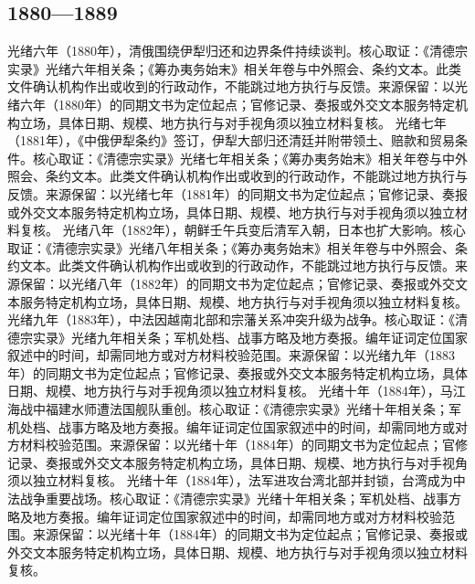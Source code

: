 \subsection{1880—1889}
光绪六年（1880年），清俄围绕伊犁归还和边界条件持续谈判。核心取证：《清德宗实录》光绪六年相关条；《筹办夷务始末》相关年卷与中外照会、条约文本。此类文件确认机构作出或收到的行政动作，不能跳过地方执行与反馈。来源保留：以光绪六年（1880年）的同期文书为定位起点；官修记录、奏报或外交文本服务特定机构立场，具体日期、规模、地方执行与对手视角须以独立材料复核。
光绪七年（1881年），《中俄伊犁条约》签订，伊犁大部归还清廷并附带领土、赔款和贸易条件。核心取证：《清德宗实录》光绪七年相关条；《筹办夷务始末》相关年卷与中外照会、条约文本。此类文件确认机构作出或收到的行政动作，不能跳过地方执行与反馈。来源保留：以光绪七年（1881年）的同期文书为定位起点；官修记录、奏报或外交文本服务特定机构立场，具体日期、规模、地方执行与对手视角须以独立材料复核。
光绪八年（1882年），朝鲜壬午兵变后清军入朝，日本也扩大影响。核心取证：《清德宗实录》光绪八年相关条；《筹办夷务始末》相关年卷与中外照会、条约文本。此类文件确认机构作出或收到的行政动作，不能跳过地方执行与反馈。来源保留：以光绪八年（1882年）的同期文书为定位起点；官修记录、奏报或外交文本服务特定机构立场，具体日期、规模、地方执行与对手视角须以独立材料复核。
光绪九年（1883年），中法因越南北部和宗藩关系冲突升级为战争。核心取证：《清德宗实录》光绪九年相关条；军机处档、战事方略及地方奏报。编年证词定位国家叙述中的时间，却需同地方或对方材料校验范围。来源保留：以光绪九年（1883年）的同期文书为定位起点；官修记录、奏报或外交文本服务特定机构立场，具体日期、规模、地方执行与对手视角须以独立材料复核。
光绪十年（1884年），马江海战中福建水师遭法国舰队重创。核心取证：《清德宗实录》光绪十年相关条；军机处档、战事方略及地方奏报。编年证词定位国家叙述中的时间，却需同地方或对方材料校验范围。来源保留：以光绪十年（1884年）的同期文书为定位起点；官修记录、奏报或外交文本服务特定机构立场，具体日期、规模、地方执行与对手视角须以独立材料复核。
光绪十年（1884年），法军进攻台湾北部并封锁，台湾成为中法战争重要战场。核心取证：《清德宗实录》光绪十年相关条；军机处档、战事方略及地方奏报。编年证词定位国家叙述中的时间，却需同地方或对方材料校验范围。来源保留：以光绪十年（1884年）的同期文书为定位起点；官修记录、奏报或外交文本服务特定机构立场，具体日期、规模、地方执行与对手视角须以独立材料复核。
